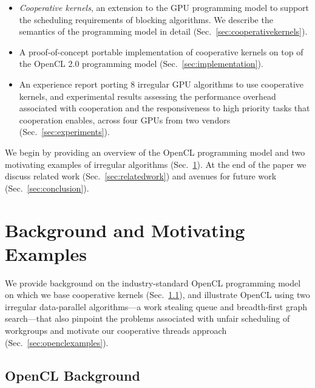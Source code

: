 \documentclass[numbers,nocopyrightspace,10pt]{sigplanconf}
\newcommand{\mysec}{Sec.~}
\newcommand{\NumAlgorithms}{8}
\begin{document}
\begin{itemize}

\item \emph{Cooperative kernels}, an extension to the GPU programming model to support the scheduling requirements of blocking algorithms.  We describe the semantics of the programming model in detail (\mysec\ref{sec:cooperativekernels}). 

\item A proof-of-concept portable implementation of cooperative
  kernels on top of the OpenCL 2.0 programming model
  (\mysec\ref{sec:implementation}).

\item An experience report porting \NumAlgorithms{} irregular GPU
  algorithms to use cooperative kernels, and experimental results
  assessing the performance overhead associated with cooperation and
  the responsiveness to high priority tasks that cooperation enables,
  across four GPUs from two vendors (\mysec\ref{sec:experiments}).

\end{itemize}

We begin by providing an overview of the OpenCL programming model and
two motivating examples of irregular algorithms (\mysec\ref{sec:background}).  At the end of the paper we discuss related work (\mysec\ref{sec:relatedwork}) and avenues for future work (\mysec\ref{sec:conclusion}).

\section{Background and Motivating Examples}\label{sec:background}

We provide background on the industry-standard OpenCL programming
model on which we base cooperative kernels (\mysec\ref{sec:opencl}),
and illustrate OpenCL using two irregular data-parallel algorithms---a
work stealing queue and breadth-first graph search---that also
pinpoint the problems associated with unfair scheduling of workgroups
and motivate our cooperative threads approach (\mysec\ref{sec:openclexamples}).

\subsection{OpenCL Background}\label{sec:opencl}

\end{document}
